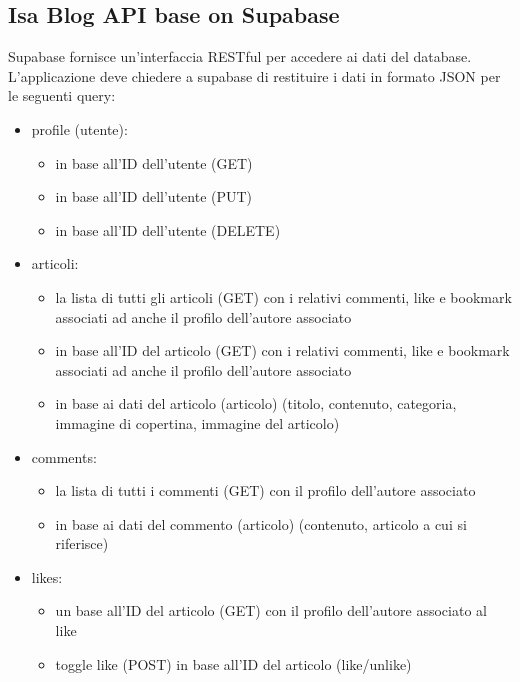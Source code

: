 \documentclass{article}
\begin{document}
    \subsection{Isa Blog API base on Supabase}

    Supabase fornisce un'interfaccia RESTful per accedere ai dati del database.
    L'applicazione deve chiedere a supabase di restituire i dati in formato JSON per le seguenti query:

    \begin{itemize}
        \item profile (utente):
        \begin{itemize}
            \item in base all'ID dell'utente (GET)
            \item in base all'ID dell'utente (PUT)
            \item in base all'ID dell'utente (DELETE)
        \end{itemize}
        \item articoli:
        \begin{itemize}
            \item la lista di tutti gli articoli (GET) con i relativi commenti, like e bookmark associati ad anche il profilo dell'autore associato
            \item in base all'ID del articolo (GET) con i relativi commenti, like e bookmark associati ad anche il profilo dell'autore associato
            \item in base ai dati del articolo (articolo) (titolo, contenuto, categoria, immagine di copertina, immagine del articolo)
        \end{itemize}
        \item comments:
        \begin{itemize}
            \item la lista di tutti i commenti (GET) con il profilo dell'autore associato
            \item in base ai dati del commento (articolo) (contenuto, articolo a cui si riferisce)
        \end{itemize}
        \item likes:
        \begin{itemize}
            \item un base all'ID del articolo (GET) con il profilo dell'autore associato al like
            \item toggle like (POST) in base all'ID del articolo (like/unlike)
        \end{itemize}

\end{itemize}
\end{document}

